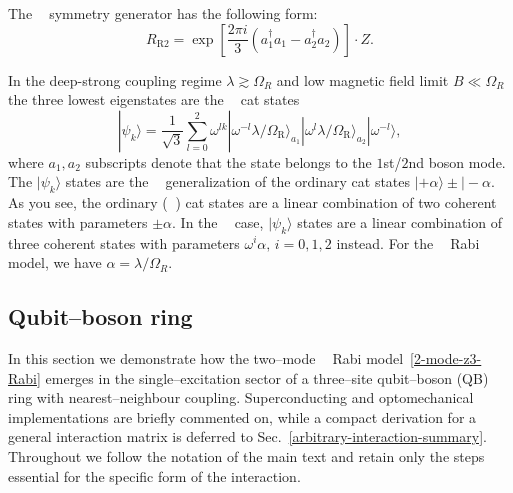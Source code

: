 \documentclass[reprint, aps, prx, amsmath, amssymb, longbibliography, superscriptaddress]{revtex4-2}
\DeclareMathOperator{\Zthree}{\mathbb{Z}_3}
\DeclareMathOperator{\Ztwo}{\mathbb{Z}_2}
\begin{document}
The $\Zthree$ symmetry generator has the following form:
\begin{equation}
     R_{\text{R}2} = \exp\left[\frac{2\pi i}{3}(a_1^{\dagger}  a_1 -  a_2^{\dagger}  a_2)\right] \cdot Z.
   \end{equation}
   
In the deep-strong coupling regime $\lambda \gtrsim \Omega_R$ and low magnetic field limit $ B \ll \Omega_R$ the three lowest eigenstates are the $\Zthree$ cat states
\begin{equation}
\label{three-cat-states}
    |\psi_k\rangle = \frac{1}{\sqrt{3}}\sum\limits_{l=0}^2 \omega^{lk}|\omega^{-l} \lambda/\Omega_{\text{R}}\rangle_{ a_1}|\omega^l \lambda/\Omega_{\text{R}}\rangle_{ a_2} |\omega^{-l} \rangle,
\end{equation}
where $a_1, a_2$ subscripts denote that the state belongs to the $1$st/$2$nd boson mode. The $|\psi_k\rangle$ states are the $\Zthree$ generalization of the ordinary cat states $|+\alpha\rangle \pm |-\alpha$. As you see, the ordinary ($\Ztwo$) cat states are a linear combination of two coherent states with parameters $\pm\alpha$. In the $\Zthree$ case, $|\psi_k\rangle$ states are a linear combination of three coherent states with parameters $\omega^i \alpha, \, i = 0,1,2$ instead. For the $\Zthree$ Rabi model, we have $\alpha = \lambda/\Omega_R$. 

\subsection{Qubit--boson ring}
\label{physical-implementation}

In this section we demonstrate how the two--mode $\Zthree$ Rabi model~\eqref{2-mode-z3-Rabi} emerges
in the single--excitation sector of a three--site qubit--boson (QB) ring with
nearest--neighbour coupling.  Superconducting and optomechanical
implementations are briefly commented on, while a compact derivation for a
general interaction matrix is deferred to
Sec.~\ref{arbitrary-interaction-summary}.  Throughout we follow the notation of the
main text and retain only the steps essential for the specific form of the
interaction.
\end{document}
